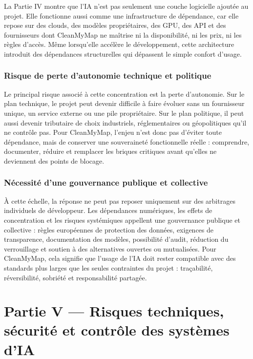 \documentclass[
  10pt,
  a4paper,
  DIV=11,
  numbers=noendperiod,
  oneside]{scrreprt}
\begin{document}
La Partie IV montre que l'IA n'est pas seulement une couche logicielle
ajoutée au projet. Elle fonctionne aussi comme une infrastructure de
dépendance, car elle repose sur des clouds, des modèles propriétaires,
des GPU, des API et des fournisseurs dont CleanMyMap ne maîtrise ni la
disponibilité, ni les prix, ni les règles d'accès. Même lorsqu'elle
accélère le développement, cette architecture introduit des dépendances
structurelles qui dépassent le simple confort d'usage.

\subsection{Risque de perte d'autonomie technique et
politique}\label{risque-de-perte-dautonomie-technique-et-politique}

Le principal risque associé à cette concentration est la perte
d'autonomie. Sur le plan technique, le projet peut devenir difficile à
faire évoluer sans un fournisseur unique, un service externe ou une pile
propriétaire. Sur le plan politique, il peut aussi devenir tributaire de
choix industriels, réglementaires ou géopolitiques qu'il ne contrôle
pas. Pour CleanMyMap, l'enjeu n'est donc pas d'éviter toute dépendance,
mais de conserver une souveraineté fonctionnelle réelle : comprendre,
documenter, réduire et remplacer les briques critiques avant qu'elles ne
deviennent des points de blocage.

\subsection{Nécessité d'une gouvernance publique et
collective}\label{nuxe9cessituxe9-dune-gouvernance-publique-et-collective}

À cette échelle, la réponse ne peut pas reposer uniquement sur des
arbitrages individuels de développeur. Les dépendances numériques, les
effets de concentration et les risques systémiques appellent une
gouvernance publique et collective : règles européennes de protection
des données, exigences de transparence, documentation des modèles,
possibilité d'audit, réduction du verrouillage et soutien à des
alternatives ouvertes ou mutualisées. Pour CleanMyMap, cela signifie que
l'usage de l'IA doit rester compatible avec des standards plus larges
que les seules contraintes du projet : traçabilité, réversibilité,
sobriété et responsabilité partagée.

\newpage{}

\chapter{Partie V --- Risques techniques, sécurité et contrôle des
systèmes
d'IA}\label{partie-v-risques-techniques-securite-et-controle-des-systemes-dia}
\end{document}

